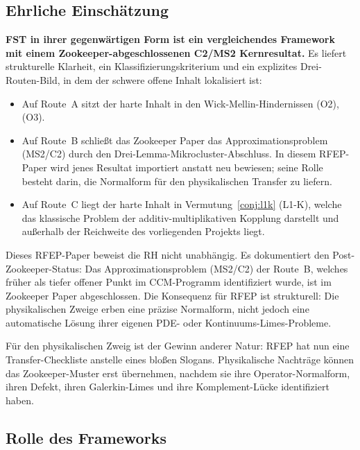 \documentclass[11pt,a4paper]{article}
\theoremstyle{plain}
\theoremstyle{definition}
\begin{document}
\subsection{Ehrliche Einschätzung}

\textbf{FST in ihrer gegenwärtigen Form ist ein vergleichendes Framework
mit einem Zookeeper-abgeschlossenen C2/MS2 Kernresultat.}
Es liefert strukturelle Klarheit, ein Klassifizierungskriterium und ein explizites
Drei-Routen-Bild, in dem der schwere offene Inhalt lokalisiert ist:

\begin{itemize}[leftmargin=*]
\item Auf Route~A sitzt der harte Inhalt in den Wick-Mellin-Hindernissen (O2), (O3).
\item Auf Route~B schließt das Zookeeper Paper das Approximationsproblem (MS2/C2)
  durch den Drei-Lemma-Mikrocluster-Abschluss. In diesem RFEP-Paper wird jenes
  Resultat importiert anstatt neu bewiesen; seine Rolle besteht darin, die Normalform für den
  physikalischen Transfer zu liefern.
\item Auf Route~C liegt der harte Inhalt in Vermutung~\ref{conj:l1k} (L1-K),
  welche das klassische Problem der additiv-multiplikativen Kopplung darstellt
  und außerhalb der Reichweite des vorliegenden Projekts liegt.
\end{itemize}

Dieses RFEP-Paper beweist die RH nicht unabhängig. Es dokumentiert
den Post-Zookeeper-Status: Das Approximationsproblem (MS2/C2) der Route~B,
welches früher als tiefer offener Punkt im CCM-Programm identifiziert wurde,
ist im Zookeeper Paper abgeschlossen. Die Konsequenz für RFEP ist strukturell:
Die physikalischen Zweige erben eine präzise Normalform, nicht jedoch eine automatische
Lösung ihrer eigenen PDE- oder Kontinuums-Limes-Probleme.

Für den physikalischen Zweig ist der Gewinn anderer Natur: RFEP hat nun eine
Transfer-Checkliste anstelle eines bloßen Slogans. Physikalische Nachträge
können das Zookeeper-Muster erst übernehmen, nachdem sie ihre Operator-Normalform,
ihren Defekt, ihren Galerkin-Limes und ihre Komplement-Lücke identifiziert haben.

\subsection{Rolle des Frameworks}
\end{document}
